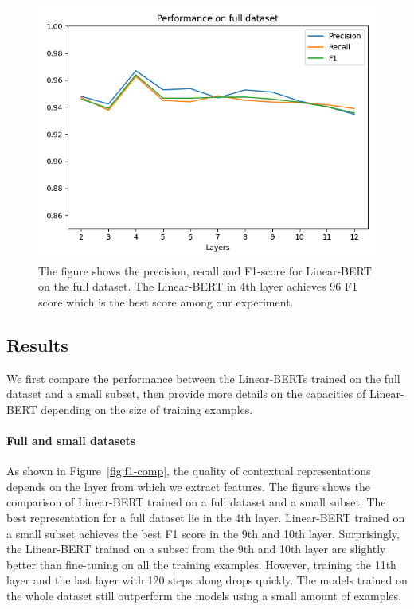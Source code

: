 \documentclass[11pt,a4paper]{article}
\begin{document}
\begin{figure}
\begin{center}
  \includegraphics[width=\linewidth]{f1-full.png}
  \caption{\label{fig:f1-full}The figure shows the precision, recall and F1-score for Linear-BERT on the full dataset. The Linear-BERT in 4th layer achieves 96 F1 score which is the best score among our experiment.}
\end{center}
\end{figure}

\subsection{Results}

We first compare the performance between the Linear-BERTs trained on the full dataset and a small subset, then provide more details on the capacities of Linear-BERT depending on the size of training examples.

\paragraph{Full and small datasets}
As shown in Figure~\ref{fig:f1-comp}, the quality of contextual representations depends on the layer from which we extract features. The figure shows the comparison of Linear-BERT trained on a full dataset and a small subset.  The best representation for a full dataset lie in the 4th layer. Linear-BERT trained on a small subset achieves the best F1 score in the 9th and 10th layer. Surprisingly, the Linear-BERT trained on a subset from the 9th and 10th layer are slightly better than fine-tuning on all the training examples. However, training the 11th layer and the last layer with 120 steps along drops quickly. The models trained on the whole dataset still outperform the models using a small amount of examples.
\end{document}
